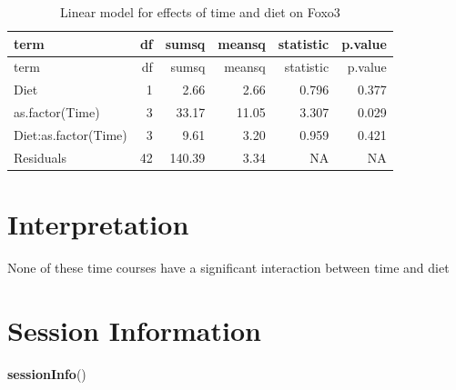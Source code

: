 \documentclass[]{article}
\newenvironment{Shaded}{\begin{snugshade}}{\end{snugshade}}
\newcommand{\KeywordTok}[1]{\textcolor[rgb]{0.13,0.29,0.53}{\textbf{#1}}}
\newcommand{\NormalTok}[1]{#1}
\begin{document}
\begin{longtable}[]{@{}lrrrrr@{}}
\caption{Linear model for effects of time and diet on
Foxo3}\tabularnewline
\toprule
term & df & sumsq & meansq & statistic & p.value\tabularnewline
\midrule
\endfirsthead
\toprule
term & df & sumsq & meansq & statistic & p.value\tabularnewline
\midrule
\endhead
Diet & 1 & 2.66 & 2.66 & 0.796 & 0.377\tabularnewline
as.factor(Time) & 3 & 33.17 & 11.05 & 3.307 & 0.029\tabularnewline
Diet:as.factor(Time) & 3 & 9.61 & 3.20 & 0.959 & 0.421\tabularnewline
Residuals & 42 & 140.39 & 3.34 & NA & NA\tabularnewline
\bottomrule
\end{longtable}

\section{Interpretation}\label{interpretation}

None of these time courses have a significant interaction between time
and diet

\section{Session Information}\label{session-information}

\begin{Shaded}
\begin{Highlighting}[]
\KeywordTok{sessionInfo}\NormalTok{()}
\end{Highlighting}
\end{Shaded}
\end{document}
